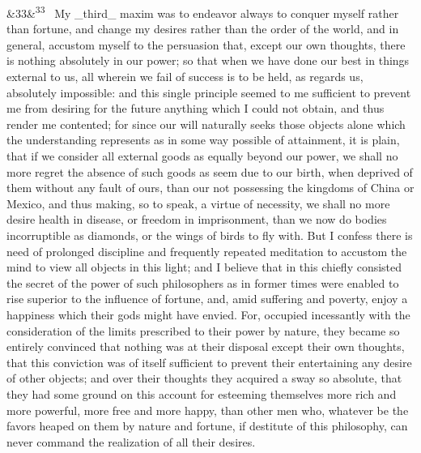 \documentclass[12pt]{article}
\newcommand{\para}[1][]{\par\noindent\ifx&#1&\else\textsuperscript{\footnotesize #1}~\fi}
\begin{document}
\para[33] My \_third\_ maxim was to endeavor always to conquer myself rather than fortune, and change my desires rather than the order of the world, and in general, accustom myself to the persuasion that, except our own thoughts, there is nothing absolutely in our power; so that when we have done our best in things external to us, all wherein we fail of success is to be held, as regards us, absolutely impossible: and this single principle seemed to me sufficient to prevent me from desiring for the future anything which I could not obtain, and thus render me contented; for since our will naturally seeks those objects alone which the understanding represents as in some way possible of attainment, it is plain, that if we consider all external goods as equally beyond our power, we shall no more regret the absence of such goods as seem due to our birth, when deprived of them without any fault of ours, than our not possessing the kingdoms of China or Mexico, and thus making, so to speak, a virtue of necessity, we shall no more desire health in disease, or freedom in imprisonment, than we now do bodies incorruptible as diamonds, or the wings of birds to fly with. But I confess there is need of prolonged discipline and frequently repeated meditation to accustom the mind to view all objects in this light; and I believe that in this chiefly consisted the secret of the power of such philosophers as in former times were enabled to rise superior to the influence of fortune, and, amid suffering and poverty, enjoy a happiness which their gods might have envied. For, occupied incessantly with the consideration of the limits prescribed to their power by nature, they became so entirely convinced that nothing was at their disposal except their own thoughts, that this conviction was of itself sufficient to prevent their entertaining any desire of other objects; and over their thoughts they acquired a sway so absolute, that they had some ground on this account for esteeming themselves more rich and more powerful, more free and more happy, than other men who, whatever be the favors heaped on them by nature and fortune, if destitute of this philosophy, can never command the realization of all their desires.
\end{document}
